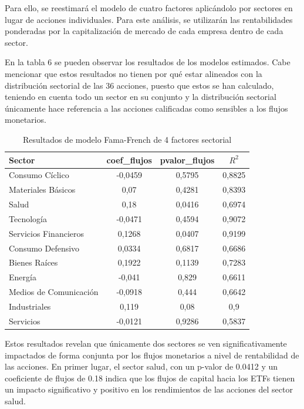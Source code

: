 \documentclass[12pt,a4paper]{article}
\begin{document}
Para ello, se reestimará el modelo de cuatro factores aplicándolo por sectores en lugar de acciones individuales. Para este análisis, se utilizarán las rentabilidades ponderadas por la capitalización de mercado de cada empresa dentro de cada sector.

En la tabla 6 se pueden observar los resultados de los modelos estimados. Cabe mencionar que estos resultados no tienen por qué estar alineados con la distribución sectorial de las 36 acciones, puesto que estos se han calculado, teniendo en cuenta todo un sector en su conjunto y la distribución sectorial únicamente hace referencia a las acciones calificadas como sensibles a los flujos monetarios.

\begin{table}[H]
\centering
\caption{Resultados de modelo Fama-French de 4 factores sectorial}
\label{tab:sector_results}
\begin{tabular}{lccc}
\toprule
\textbf{Sector} & \textbf{coef\_flujos} & \textbf{pvalor\_flujos} & \textbf{$R^2$} \\
\midrule
Consumo Cíclico & -0,0459 & 0,5795 & 0,8825 \\
Materiales Básicos & 0,07 & 0,4281 & 0,8393 \\
Salud & 0,18 & 0,0416 & 0,6974 \\
Tecnología & -0,0471 & 0,4594 & 0,9072 \\
Servicios Financieros & 0,1268 & 0,0407 & 0,9199 \\
Consumo Defensivo & 0,0334 & 0,6817 & 0,6686 \\
Bienes Raíces & 0,1922 & 0,1139 & 0,7283 \\
Energía & -0,041 & 0,829 & 0,6611 \\
Medios de Comunicación & -0,0918 & 0,444 & 0,6642 \\
Industriales & 0,119 & 0,08 & 0,9 \\
Servicios & -0,0121 & 0,9286 & 0,5837 \\
\bottomrule
\end{tabular}
\end{table}

Estos resultados revelan que únicamente dos sectores se ven significativamente impactados de forma conjunta por los flujos monetarios a nivel de rentabilidad de las acciones. En primer lugar, el sector salud, con un p-valor de 0.0412 y un coeficiente de flujos de 0.18 indica que los flujos de capital hacia los ETFs tienen un impacto significativo y positivo en los rendimientos de las acciones del sector salud.
\end{document}

